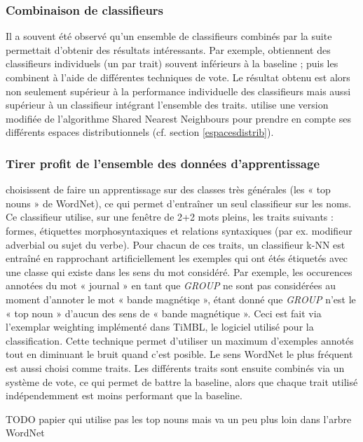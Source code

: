 \subsubsection{Combinaison de classifieurs}

Il a souvent été observé qu'un ensemble de classifieurs combinés par la suite
permettait d'obtenir des résultats intéressants. Par exemple,
\cite{kohomban2005learning,dinu2007sometimes} obtiennent des classifieurs
individuels (un par trait) souvent inférieurs à la baseline ; puis les
combinent à l'aide de différentes techniques de vote. Le résultat obtenu est
alors non seulement supérieur à la performance individuelle des classifieurs
mais aussi supérieur à un classifieur intégrant l'ensemble des traits.
\cite{mouton2009induction} utilise une version modifiée de l'algorithme Shared
Nearest Neighbours pour prendre en compte ses différents espaces
distributionnels  (cf. section \ref{espacesdistrib}).

\subsubsection{Tirer profit de l'ensemble des données d'apprentissage}

\cite{kohomban2005learning} choisissent de faire un apprentissage sur des
classes très générales (les « top nouns » de WordNet), ce qui permet
d'entraîner un seul classifieur sur les noms. Ce classifieur utilise, sur une
fenêtre de 2+2 mots pleins, les traits suivants : formes, étiquettes
morphosyntaxiques et relations syntaxiques (par ex. modifieur adverbial ou
sujet du verbe). Pour chacun de ces traits, un classifieur k-NN est entraîné en
rapprochant artificiellement les exemples qui ont étés étiquetés avec une
classe qui existe dans les sens du mot considéré. Par exemple, les occurences
annotées du mot « journal » en tant que \textit{GROUP} ne sont pas considérées
au moment d'annoter le mot « bande magnétiqe », étant donné que \textit{GROUP}
n'est le « top noun » d'aucun des sens de « bande magnétique ». Ceci est fait
via l'exemplar weighting implémenté dans TiMBL, le logiciel utilisé pour la
classification. Cette technique permet d'utiliser un maximum d'exemples annotés
tout en diminuant le bruit quand c'est posible. Le sens WordNet le plus
fréquent est aussi choisi comme traits. Les différents traits sont ensuite
combinés via un système de vote, ce qui permet de battre la baseline, alors que
chaque trait utilisé indépendemment est moins performant que la baseline.

TODO papier qui utilise pas les top nouns mais va un peu plus loin dans l'arbre WordNet

